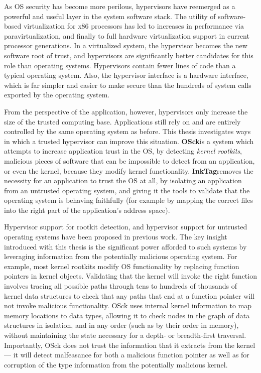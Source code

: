 \documentclass{article}
\newcommand{\osck}{OSck\xspace}
\newcommand{\inktag}{InkTag\xspace}
\begin{document}
As OS security has become more perilous, hypervisors have reemerged as a
powerful and useful layer in the system software stack. The utility of
software-based virtualization for x86 processors has led to increases in
performance via paravirtualization, and finally to full hardware
virtualization support in current processor generations. In a virtualized
system, the hypervisor becomes the new software root of trust, and
hypervisors are significantly better candidates for this role than
operating systems. Hypervisors contain fewer lines of code than a typical
operating system. Also, the hypervisor interface is a hardware interface,
which is far simpler and easier to make secure than the hundreds of system
calls exported by the operating system.


From the perspective of the application, however, hypervisors only increase
the size of the trusted computing base. Applications still rely on and are
entirely controlled by the same operating system as before. This thesis
investigates ways in which a trusted hypervisor can improve this situation.
\textbf{\osck }is a system which attempts to increase application trust in
the OS, by detecting \emph{kernel rootkits}, malicious pieces of software
that can be impossible to detect from an application, or even the kernel,
because they modify kernel functionality. \textbf{\inktag }removes the
necessity for an application to trust the OS at all, by isolating an
application from an untrusted operating system, and giving it the tools to
validate that the operating system is behaving faithfully (for example by
mapping the correct files into the right part of the application's address
space).

Hypervisor support for rootkit detection, and hypervisor support for
untrusted operating systems have been proposed in previous work. The key
insight introduced with this thesis is the significant power afforded to
such systems by leveraging information from the potentially malicious
operating system. For example, most kernel rootkits modify OS functionality
by replacing function pointers in kernel objects. Validating that the
kernel will invoke the right function involves tracing all possible paths
through tens to hundreds of thousands of kernel data structures to check
that any paths that end at a function pointer will not invoke malicious
functionality. \osck uses internal kernel information to map memory
locations to data types, allowing it to check nodes in the graph of data
structures in isolation, and in any order (such as by their order in
memory), without maintaining the state necessary for a depth- or
breadth-first traversal.  Importantly, \osck does not trust the information
that it extracts from the kernel --- it will detect malfeasance for both a
malicious function pointer as well as for corruption of the type
information from the potentially malicious kernel.
\end{document}
